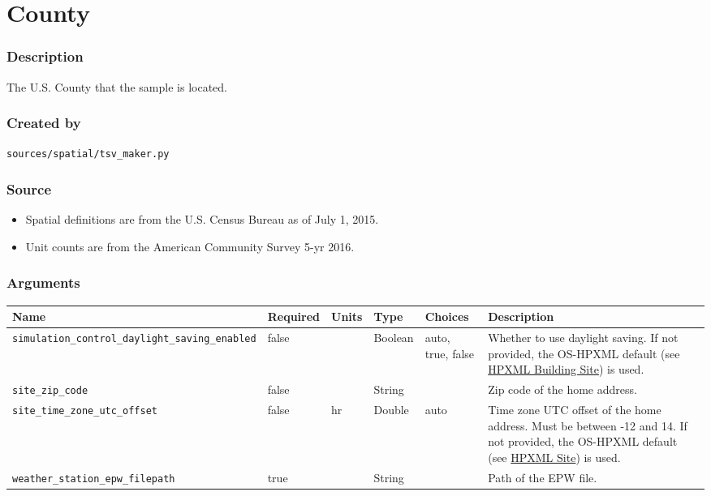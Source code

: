 \section{County}\label{county}

\subsubsection{Description}\label{description-27}

The U.S. County that the sample is located.

\subsubsection{Created by}\label{created-by-27}

\texttt{sources/spatial/tsv\_maker.py}

\subsubsection{Source}\label{source-27}

\begin{itemize}
 
\item
  Spatial definitions are from the U.S. Census Bureau as of July 1,
  2015.
\item
  Unit counts are from the American Community Survey 5-yr 2016.
\end{itemize}

\subsubsection{Arguments}\label{arguments-17}

\begin{longtable}[]{@{}llllll@{}}
\toprule\noalign{}
Name & Required & Units & Type & Choices & Description \\
\midrule\noalign{}
\endhead
\bottomrule\noalign{}
\endlastfoot
\texttt{simulation\_control\_daylight\_saving\_enabled} & false & &
Boolean & auto, true, false & Whether to use daylight saving. If not
provided, the OS-HPXML default (see
\href{https://openstudio-hpxml.readthedocs.io/en/v1.7.0/workflow_inputs.html\#hpxml-building-site}{HPXML
Building Site}) is used. \\
\texttt{site\_zip\_code} & false & & String & & Zip code of the home
address. \\
\texttt{site\_time\_zone\_utc\_offset} & false & hr & Double & auto &
Time zone UTC offset of the home address. Must be between -12 and 14. If
not provided, the OS-HPXML default (see
\href{https://openstudio-hpxml.readthedocs.io/en/v1.7.0/workflow_inputs.html\#hpxml-site}{HPXML
Site}) is used. \\
\texttt{weather\_station\_epw\_filepath} & true & & String & & Path of
the EPW file. \\
\end{longtable}

